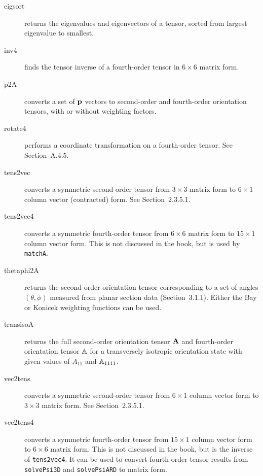 \documentclass[11pt]{article}
\begin{document}
\begin{description}

    \item[eigsort]{returns the eigenvalues and eigenvectors of a tensor, sorted from largest eigenvalue to smallest.}

    \item[inv4]{finds the tensor inverse of a fourth-order tensor in $6 \times 6$ matrix form.}

    \item[p2A]{converts a set of $\mathbf{p}$ vectors to second-order and fourth-order orientation tensors, with or without weighting factors.}

    \item[rotate4]{performs a coordinate transformation on a fourth-order tensor.  See Section~A.4.5.}

    \item[tens2vec]{converts a symmetric second-order tensor from $3 \times 3$ matrix form to $6 \times 1$ column vector (contracted) form.  See Section~2.3.5.1.}

    \item[tens2vec4]{converts a symmetric fourth-order tensor from $6 \times 6$ matrix form to $15 \times 1$ column vector form.  This is not discussed in the book, but is used by \texttt{matchA}.}

    \item[thetaphi2A]{returns the second-order orientation tensor corresponding to a set of angles $(\theta, \phi)$ measured from planar section data (Section~3.1.1).  Either the Bay or Konicek weighting functions can be used.}

    \item[transisoA]{returns the full second-order orientation tensor $\mathbf{A}$ and fourth-order orientation tensor $\mathbb{A}$ for a transversely isotropic orientation state with given values of $A_{11}$ and $\mathbb{A}_{1111}$.}

    \item[vec2tens]{converts a symmetric second-order tensor from $6 \times 1$ column vector form to $3 \times 3$ matrix form.  See Section~2.3.5.1.}

    \item[vec2tens4]{converts a symmetric fourth-order tensor from $15 \times 1$ column vector form to $6 \times 6$ matrix form.  This is not discussed in the book, but is the inverse of \texttt{tens2vec4}.  It can be used to convert fourth-order tensor results from \texttt{solvePsi3D} and \texttt{solvePsiARD} to matrix form.}
    
\end{description}
\end{document}
